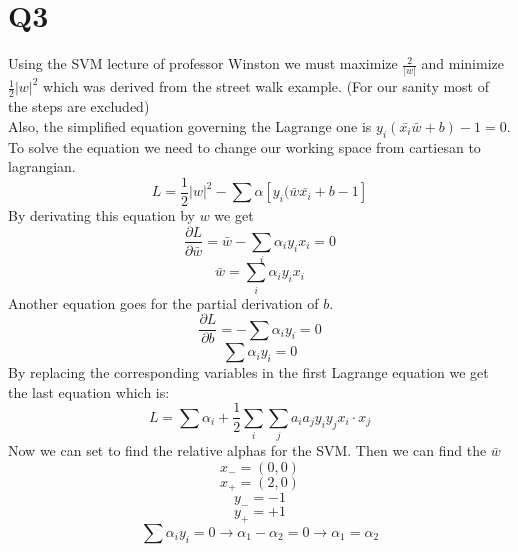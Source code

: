 \documentclass[a4paper, 11pt]{article}
\begin{document}
\section{Q3}
Using the SVM lecture of professor Winston we must maximize $\frac{2}{|w|}$ and
minimize $\frac{1}{2}|w|^2$ which was derived from
the street walk example. (For our sanity most of the steps are excluded) \\
Also, the simplified equation governing the Lagrange one is
$y_i(\bar{x_i}\bar{w} + b) - 1 = 0$.
To solve the equation we need to change our working space from
cartiesan to lagrangian.
\begin{equation}
    L = \frac{1}{2}|w|^2 - \sum\alpha[y_i(\bar{w}\bar{x_i} + b - 1]
\end{equation}
By derivating this equation by $w$ we get
\begin{equation}
    \frac{\partial L}{\partial \bar{w}} = \bar{w} - \sum_i \alpha_i y_i x_i = 0
\end{equation}
\begin{equation}
    \bar{w} = \sum_i \alpha_i y_i x_i
\end{equation}
Another equation goes for the partial derivation of $b$.
\begin{equation}
    \frac{\partial L}{\partial b} = -\sum \alpha_i y_i = 0
\end{equation}
\begin{equation}
    \sum \alpha_i y_i = 0
\end{equation}
By replacing the corresponding variables in the first Lagrange equation we get
the last equation which is:
\begin{equation}
    L = \sum \alpha_i + \frac{1}{2} \sum_i \sum_j a_i a_j y_i y_j x_i \cdot x_j
\end{equation}
Now we can set to find the relative alphas for the SVM. Then we can find the
$\bar{w}$
\begin{equation}
    x_{-} =  (0, 0)
\end{equation}
\begin{equation}
    x_{+} = (2, 0)
\end{equation}
\begin{equation}
    y_{-} = -1
\end{equation}
\begin{equation}
    y_{+} = +1
\end{equation}
\begin{equation}
    \sum \alpha_i y_i = 0 \rightarrow \alpha_1 - \alpha_2 = 0 \rightarrow \alpha_1 = \alpha_2
\end{equation}
\end{document}
